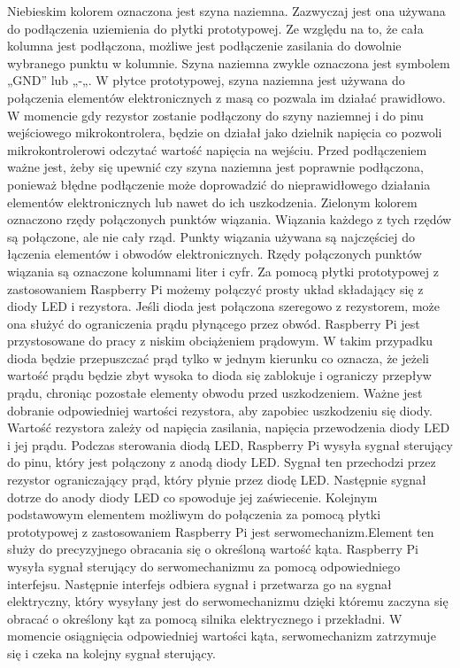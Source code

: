 Niebieskim kolorem oznaczona jest szyna naziemna. Zazwyczaj jest ona używana do podłączenia uziemienia do płytki prototypowej. Ze względu na to, że cała kolumna jest podłączona, możliwe jest podłączenie zasilania do dowolnie wybranego punktu w kolumnie. Szyna naziemna zwykle oznaczona jest symbolem „GND” lub „-„. W płytce prototypowej, szyna naziemna jest używana do połączenia elementów elektronicznych z masą co pozwala im działać prawidłowo. W momencie gdy rezystor zostanie podłączony do szyny naziemnej i do pinu wejściowego mikrokontrolera, będzie on działał jako dzielnik napięcia co pozwoli mikrokontrolerowi odczytać wartość napięcia na wejściu. Przed podłączeniem ważne jest, żeby się upewnić czy szyna naziemna jest poprawnie podłączona, ponieważ błędne podłączenie może doprowadzić do nieprawidłowego działania elementów elektronicznych lub nawet do ich uszkodzenia.
Zielonym kolorem oznaczono rzędy połączonych punktów wiązania. Wiązania każdego z tych rzędów są połączone, ale nie cały rząd. Punkty wiązania używana są najczęściej do łączenia elementów i obwodów elektronicznych. Rzędy połączonych punktów wiązania są oznaczone kolumnami liter i cyfr.
Za pomocą płytki prototypowej z zastosowaniem Raspberry Pi możemy połączyć prosty układ składający się z diody LED i rezystora. Jeśli dioda jest połączona szeregowo z rezystorem, może ona służyć do ograniczenia prądu płynącego przez obwód. Raspberry Pi jest przystosowane do pracy z niskim obciążeniem prądowym. W takim przypadku dioda będzie przepuszczać prąd tylko w jednym kierunku co oznacza, że jeżeli wartość prądu będzie zbyt wysoka to dioda się zablokuje i ograniczy przepływ prądu, chroniąc pozostałe elementy obwodu przed uszkodzeniem. Ważne jest dobranie odpowiedniej wartości rezystora, aby zapobiec uszkodzeniu się diody. Wartość rezystora zależy od napięcia zasilania, napięcia przewodzenia diody LED i jej prądu. Podczas sterowania diodą LED, Raspberry Pi wysyła sygnał sterujący do pinu, który jest połączony z anodą diody LED. Sygnał ten przechodzi przez rezystor ograniczający prąd, który płynie przez diodę LED. Następnie sygnał dotrze do anody diody LED co spowoduje jej zaświecenie.
Kolejnym podstawowym elementem możliwym do połączenia za pomocą płytki prototypowej z zastosowaniem Raspberry Pi jest serwomechanizm.Element ten służy do precyzyjnego obracania się o określoną wartość kąta. Raspberry Pi wysyła sygnał sterujący do serwomechanizmu za pomocą odpowiedniego interfejsu. Następnie interfejs odbiera sygnał i przetwarza go na sygnał elektryczny, który wysyłany jest do serwomechanizmu dzięki któremu zaczyna się obracać o określony kąt za pomocą silnika elektrycznego i przekładni. W momencie osiągnięcia odpowiedniej wartości kąta, serwomechanizm zatrzymuje się i czeka na kolejny sygnał sterujący.

